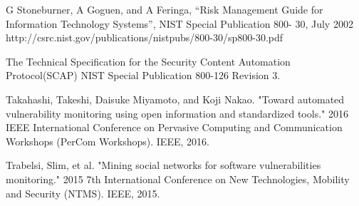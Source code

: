 \documentclass{llncs}
\begin{document}
\newpage
\begin{thebibliography}{[MT1]}

%


G Stoneburner, A Goguen, and A Feringa, “Risk Management Guide
for Information Technology Systems”, NIST Special Publication 800-
30, July 2002
http://csrc.nist.gov/publications/nistpubs/800-30/sp800-30.pdf

The Technical Specification for the
Security Content Automation Protocol(SCAP)
NIST Special Publication 800-126
Revision 3.

Takahashi, Takeshi, Daisuke Miyamoto, and Koji Nakao. "Toward automated vulnerability monitoring using open information and standardized tools." 2016 IEEE International Conference on Pervasive Computing and Communication Workshops (PerCom Workshops). IEEE, 2016.

Trabelsi, Slim, et al. "Mining social networks for software vulnerabilities monitoring." 2015 7th International Conference on New Technologies, Mobility and Security (NTMS). IEEE, 2015.
%
\end{thebibliography}
\end{document}
